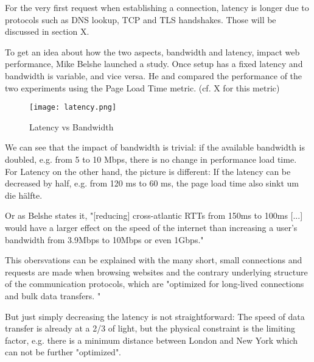 For the very first request when establishing a connection, latency is longer due to protocols such as DNS lookup, TCP and TLS handshakes.
Those will be discussed in section X. %



To get an idea about how the two aspects, bandwidth and latency, impact web performance,  Mike Belshe launched a study. %
Once setup has a fixed latency and bandwidth is variable, and vice versa.
He and compared the performance of the two experiments using the Page Load Time metric. (cf. X for this metric)


\begin{figure}[h!]
\begin{center}
\texttt{[image: latency.png]}
\caption{Latency vs Bandwidth}
\label{img:latency}
\end{center}
\end{figure}


We can see that the impact of bandwidth is trivial: if the available bandwidth is doubled, e.g. from 5 to 10 Mbps, there is no change in performance load time.
For Latency on the other hand, the picture is different: If the latency can be decreased by half, e.g. from 120 ms to 60 ms, the page load time also sinkt um die hälfte.

Or as Belshe states it, "[reducing] cross-atlantic RTTs from 150ms to 100ms [...] would have a larger effect on the speed of the internet than increasing a user's bandwidth from 3.9Mbps to 10Mbps or even 1Gbps." %

This obersvations can be explained with the many short, small connections and requests are made when browsing websites and the contrary underlying structure of the communication protocols, which are "optimized for long-lived connections and bulk data transfers. " %

But just simply decreasing the latency is not straightforward: The speed of data transfer is already at a 2/3 of light, but the physical constraint is the limiting factor, e.g. there is a minimum distance between London and New York which can not be further "optimized". %



